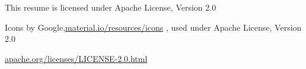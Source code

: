 \hspace{1pt}

\tiny{

	
This resume is licensed under Apache License, Version 2.0

Icons by Google,{\secondaryColor\href{https://material.io/resources/icons}{material.io/resources/icons} }, used under Apache License, Version 2.0

\secondaryColor\href{https://www.apache.org/licenses/LICENSE-2.0.html}{apache.org/licenses/LICENSE-2.0.html}


}